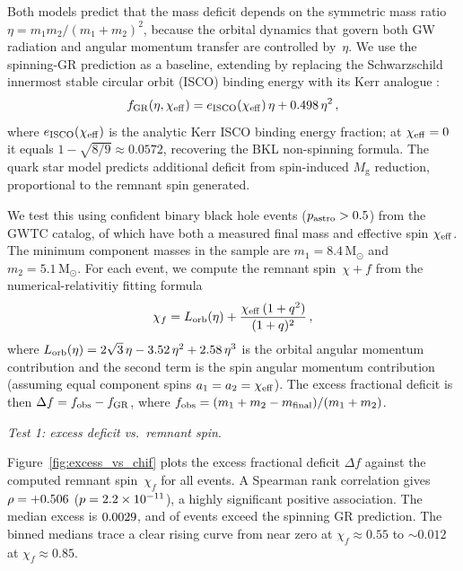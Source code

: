 \documentclass[manuscript,linenumbers]{aastex701}
\newcommand{\Msun}{\mathrm{M}_\odot}
\newcommand{\Mg}{M_{\mathrm{g}}}
\renewcommand{\paragraph}[1]{\par\medskip\noindent\textit{#1}.\ }
\begin{document}
Both models predict that the mass deficit depends on the symmetric
mass ratio $\eta = m_1 m_2 / (m_1 + m_2)^{2}$, because the orbital
dynamics that govern both GW radiation and angular momentum transfer
are controlled by~$\eta$.  We use the spinning-GR prediction as a
baseline, extending \citet{BuonannoKidderLehner2008} by replacing the
Schwarzschild innermost stable circular orbit (ISCO) binding energy
with its Kerr analogue \citep{BardeenPressTeukolsky1972}:
%
\begin{equation}\label{eq:frac_gr}
  f_{\rm GR}(\eta,\chi_{\rm eff})
  = e_{\rm ISCO}(\chi_{\rm eff})\,\eta + 0.498\,\eta^{2}\,,
\end{equation}
%
where $e_{\rm ISCO}(\chi_{\rm eff})$ is the analytic Kerr ISCO binding
energy fraction; at $\chi_{\rm eff}=0$ it equals $1-\sqrt{8/9}\approx
0.0572$, recovering the BKL non-spinning formula.  The quark star model
predicts additional deficit from spin-induced $\Mg$ reduction,
proportional to the remnant spin generated.

We test this using \gwNbbh{} confident binary black hole events
($p_{\rm astro} > 0.5$) from the GWTC catalog, of which \gwNdeficit{}
have both a measured final mass and effective spin $\chi_{\rm eff}$.
The minimum component masses in the sample are $m_1 = 8.4\,\Msun$ and
$m_2 = 5.1\,\Msun$. For each event, we compute the remnant
spin~$\chi+f$ from the numerical-relativitiy fitting formula
%
\begin{equation}\label{eq:chi_f}
  \chi_f = L_{\rm orb}(\eta) + \frac{\chi_{\rm eff}\,(1+q^{2})}{(1+q)^{2}}\,,
\end{equation}
%
where $L_{\rm orb}(\eta) = 2\sqrt{3}\,\eta - 3.52\,\eta^{2}
+ 2.58\,\eta^{3}$ is the orbital angular momentum contribution
and the second term is the spin angular momentum contribution
(assuming equal component spins $a_1 = a_2 = \chi_{\rm eff}$).
The excess fractional deficit is then
$\Delta f = f_{\rm obs} - f_{\rm GR}$, where
$f_{\rm obs} = (m_1 + m_2 - m_{\rm final}) / (m_1 + m_2)$.

\paragraph{Test 1: excess deficit vs.\ remnant spin}

Figure~\ref{fig:excess_vs_chif} plots the excess fractional deficit
$\Delta f$ against the computed remnant spin~$\chi_f$ for all
\gwNdeficit{} events.  A Spearman rank correlation gives
$\rho = +0.506$ ($p = 2.2 \times 10^{-11}$), a highly significant
positive association.  The median excess is $0.0029$, and
\gwFracPositive{} of events exceed the spinning GR prediction.
The binned medians trace a clear rising curve from near zero at
$\chi_f \approx 0.55$ to ${\sim}0.012$ at $\chi_f \approx 0.85$.
\end{document}
